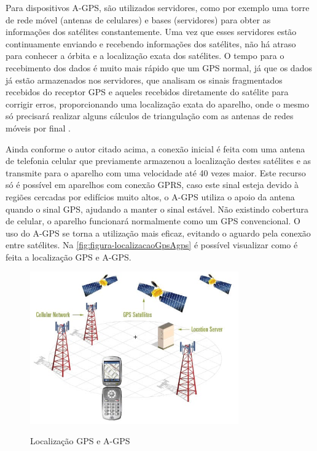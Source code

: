 Para dispositivos A-GPS, são utilizados servidores, como por exemplo uma torre de rede móvel (antenas de celulares) e bases (servidores) para obter as informações dos satélites constantemente. Uma vez que esses servidores estão continuamente enviando e recebendo informações dos satélites, não há atraso para conhecer a órbita e a localização exata dos satélites. O tempo para o recebimento dos dados é muito mais rápido que um GPS normal, já que os dados já estão armazenados nos servidores, que analisam os sinais fragmentados recebidos do receptor GPS e aqueles recebidos diretamente do satélite para corrigir erros, proporcionando uma localização exata do aparelho, onde o mesmo só precisará realizar alguns cálculos de triangulação com as antenas de redes móveis por final \cite{oficinanetagps:2018}.

Ainda conforme o autor citado acima, a conexão inicial é feita com uma antena de telefonia celular que previamente armazenou a localização destes satélites e as transmite para o aparelho com uma velocidade até 40 vezes maior. Este recurso só é possível em aparelhos com conexão GPRS, caso este sinal esteja devido à regiões cercadas por edifícios muito altos, o A-GPS utiliza o apoio da antena quando o sinal GPS, ajudando a manter o sinal estável. Não existindo cobertura de celular, o aparelho funcionará normalmente como um GPS convencional. O uso do A-GPS se torna a utilização mais eficaz, evitando o aguardo pela conexão entre satélites. Na \autoref{fig:figura-localizacaoGpsAgps} é possível visualizar como é feita a localização GPS e A-GPS.

\begin{figure}[H]
    \centering
    \caption{Localização GPS e A-GPS}
    \includegraphics[width=0.8\textwidth]{./dados/figuras/fig5}
    \label{fig:figura-localizacaoGpsAgps}
\end{figure}

